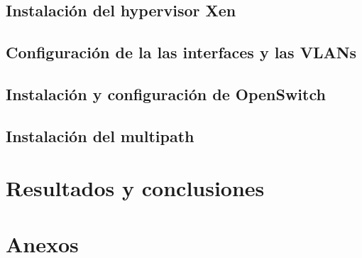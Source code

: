 \documentclass[12pt,a4paper,titlepage,twoside]{report}
\begin{document}
\section{Instalación del hypervisor Xen}
\section{Configuración de la las interfaces y las VLANs}
\section{Instalación y configuración de OpenSwitch}
\section{Instalación del multipath}

\chapter{Resultados y conclusiones}
\chapter{Anexos}

\nocite{*}
\printbibliography
\end{document}
